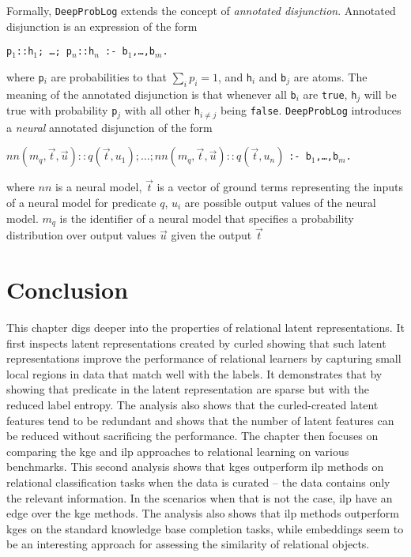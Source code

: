 \begin{tcolorbox}
	Formally, \texttt{DeepProbLog} extends the concept of \textit{annotated disjunction}.
	Annotated disjunction is an expression of the form
	\begin{center}
		\texttt{p$_1${::}h$_1$; \ldots; p$_n${::}h$_n$ {:-} b$_1$,\ldots,b$_m$.}
	\end{center}
	where \texttt{p$_i$} are probabilities to that $\sum_ip_i=1$, and \texttt{h$_i$} and \texttt{b$_j$} are atoms.
	The meaning of the annotated disjunction is that whenever all \texttt{b$_i$} are \texttt{true}, \texttt{h$_j$} will be true with probability \texttt{p$_j$} with all other \texttt{h$_{i \neq j}$} being \texttt{false}.
	\texttt{DeepProbLog} introduces a \textit{neural} annotated disjunction of the form
	\begin{center}
			$nn(m_q,\vec{t}, \vec{u}) :: q(\vec{t},u_1); \ldots; nn(m_q,\vec{t}, \vec{u}) :: q(\vec{t},u_n) $ \texttt{{:-} b$_1$,\ldots,b$_m$.}
	\end{center}
	where $nn$ is a neural model, $\vec{t}$ is a vector of ground terms representing the inputs of a neural model for predicate $q$, $u_i$ are possible output values of the neural model.
	$m_q$ is the identifier of a neural model that specifies a probability distribution over output values $\vec{u}$ given the output $\vec{t}$
\end{tcolorbox}


\section{Conclusion}


This chapter digs deeper into the properties of relational latent representations.
It first inspects latent representations created by \gls{curled} showing that such latent representations improve the performance of relational learners by capturing small local regions in data that match well with the labels.
It demonstrates that by showing that predicate in the latent representation are sparse but with the reduced label entropy.
The analysis also shows that the \gls{curled}-created latent features tend to be redundant and shows that the number of latent features can be reduced without sacrificing the performance.
The chapter then focuses on comparing the \gls{kge} and \gls{ilp} approaches to relational learning on various benchmarks.
This second analysis shows that \gls{kge}s outperform \gls{ilp} methods on relational classification tasks when the data is curated -- the data contains only the relevant information.
In the scenarios when that is not the case, \gls{ilp} have an edge over the \gls{kge} methods.
The analysis also shows that \gls{ilp} methods outperform \gls{kge}s on the standard knowledge base completion tasks, while embeddings seem to be an interesting approach for assessing the similarity of relational objects.



\cleardoublepage

